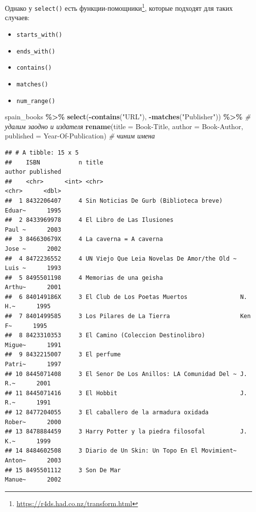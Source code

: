 \documentclass[
]{book}
\newenvironment{Shaded}{\begin{snugshade}}{\end{snugshade}}
\newcommand{\AttributeTok}[1]{\textcolor[rgb]{0.13,0.29,0.53}{#1}}
\newcommand{\CommentTok}[1]{\textcolor[rgb]{0.56,0.35,0.01}{\textit{#1}}}
\newcommand{\FunctionTok}[1]{\textcolor[rgb]{0.13,0.29,0.53}{\textbf{#1}}}
\newcommand{\NormalTok}[1]{#1}
\newcommand{\SpecialCharTok}[1]{\textcolor[rgb]{0.81,0.36,0.00}{\textbf{#1}}}
\newcommand{\StringTok}[1]{\textcolor[rgb]{0.31,0.60,0.02}{#1}}
\providecommand{\tightlist}{%
  \setlength{\itemsep}{0pt}\setlength{\parskip}{0pt}}
\theoremstyle{definition}
\theoremstyle{definition}
\theoremstyle{definition}
\theoremstyle{definition}
\theoremstyle{remark}
\begin{document}
Однако у \texttt{select()} есть функции-помощники\footnote{\url{https://r4ds.had.co.nz/transform.html}}, которые подходят для таких случаев:

\begin{itemize}
\tightlist
\item
  \texttt{starts\_with()}
\item
  \texttt{ends\_with()}
\item
  \texttt{contains()}
\item
  \texttt{matches()}
\item
  \texttt{num\_range()}
\end{itemize}

\begin{Shaded}
\begin{Highlighting}[]
\NormalTok{spain\_books }\SpecialCharTok{\%\textgreater{}\%} 
  \FunctionTok{select}\NormalTok{(}\SpecialCharTok{{-}}\FunctionTok{contains}\NormalTok{(}\StringTok{"URL"}\NormalTok{), }\SpecialCharTok{{-}}\FunctionTok{matches}\NormalTok{(}\StringTok{"Publisher"}\NormalTok{)) }\SpecialCharTok{\%\textgreater{}\%} \CommentTok{\# удалим заодно и издателя}
  \FunctionTok{rename}\NormalTok{(}\AttributeTok{title =} \StringTok{\textasciigrave{}}\AttributeTok{Book{-}Title}\StringTok{\textasciigrave{}}\NormalTok{, }
         \AttributeTok{author =} \StringTok{\textasciigrave{}}\AttributeTok{Book{-}Author}\StringTok{\textasciigrave{}}\NormalTok{,}
         \AttributeTok{published =} \StringTok{\textasciigrave{}}\AttributeTok{Year{-}Of{-}Publication}\StringTok{\textasciigrave{}}\NormalTok{) }\CommentTok{\# чиним имена}
\end{Highlighting}
\end{Shaded}

\begin{verbatim}
## # A tibble: 15 x 5
##    ISBN           n title                                       author published
##    <chr>      <int> <chr>                                       <chr>      <dbl>
##  1 8432206407     4 Sin Noticias De Gurb (Biblioteca breve)     Eduar~      1995
##  2 8433969978     4 El Libro de Las Ilusiones                   Paul ~      2003
##  3 846630679X     4 La caverna = A caverna                      Jose ~      2002
##  4 8472236552     4 UN Viejo Que Leia Novelas De Amor/the Old ~ Luis ~      1993
##  5 8495501198     4 Memorias de una geisha                      Arthu~      2001
##  6 840149186X     3 El Club de Los Poetas Muertos               N. H.~      1995
##  7 8401499585     3 Los Pilares de La Tierra                    Ken F~      1995
##  8 8423310353     3 El Camino (Coleccion Destinolibro)          Migue~      1991
##  9 8432215007     3 El perfume                                  Patri~      1997
## 10 8445071408     3 El Senor De Los Anillos: LA Comunidad Del ~ J. R.~      2001
## 11 8445071416     3 El Hobbit                                   J. R.~      1991
## 12 8477204055     3 El caballero de la armadura oxidada         Rober~      2000
## 13 8478884459     3 Harry Potter y la piedra filosofal          J. K.~      1999
## 14 8484602508     3 Diario de Un Skin: Un Topo En El Movimient~ Anton~      2003
## 15 8495501112     3 Son De Mar                                  Manue~      2002
\end{verbatim}
\end{document}

